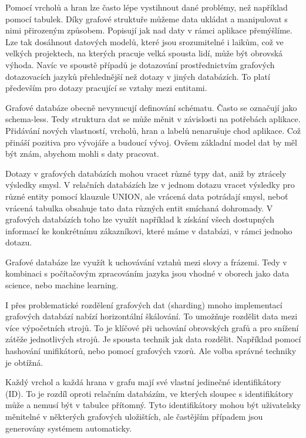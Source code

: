 \documentclass[
  program=infoi,
  biblatex=true,
  sourcecodes=true,
  figures=true,
  glossaries=false,
  index
]{kidiplom}
\begin{document}
Pomocí vrcholů a hran lze často lépe vystihnout dané problémy, než například pomocí tabulek. Díky grafové struktuře můžeme data ukládat a manipulovat s nimi přirozeným způsobem. Popisují jak nad daty v rámci aplikace přemýšlíme. Lze tak dosáhnout datových modelů, které jsou srozumitelné i laikům, což ve velkých projektech, na kterých pracuje velká spousta lidí, může být obrovská výhoda. Navíc ve spoustě případů je dotazování prostřednictvím grafových dotazovacích jazyků přehlednější než dotazy v jiných databázích. To platí především pro dotazy pracující se vztahy mezi entitami.

Grafové databáze obecně nevynucují definování schématu. Často se označují jako schema-less. Tedy struktura dat se může měnit v závislosti na potřebách aplikace. Přidávání nových vlastností, vrcholů, hran a labelů nenarušuje chod aplikace. Což přináší pozitiva pro vývojáře a budoucí vývoj. Ovšem základní model dat by měl být znám, abychom mohli s daty pracovat.

Dotazy v grafových databázích mohou vracet různé typy dat, aniž by ztrácely výsledky smysl. V relačních databázích lze v jednom dotazu vracet výsledky pro různé entity pomocí klauzule UNION, ale vrácená data potrádají smysl, neboť vrácená tabulka obsahuje tato data různých entit smíchaná dohromady. V grafových databázích toho lze využít například k získání všech dostupných informací ke konkrétnímu zákazníkovi, které máme v databázi, v rámci jednoho dotazu.

Grafové databáze lze využít k uchovávání vztahů mezi slovy a frázemi. Tedy v kombinaci s počítačovým zpracováním jazyka jsou vhodné v oborech jako data science, nebo machine learning.

I přes problematické rozdělení grafových dat (sharding) mnoho implementací grafových databází nabízí horizontální škálování. To umožňuje rozdělit data mezi více výpočetních strojů. To je klíčové při uchování obrovských grafů a pro snížení zátěže jednotlivých strojů. Je spousta technik jak data rozdělit. Například pomocí hashování unifikátorů, nebo pomocí grafových vzorů. Ale volba správné techniky je obtížná.

Každý vrchol a každá hrana v grafu mají své vlastní jedinečné identifikátory (ID). To je rozdíl oproti relačním databázím, ve kterých sloupec s identifikátory může a nemusí být v tabulce přítomný. Tyto identifikátory mohou být uživatelsky měnitelné v některých grafových uložištích, ale častějším případem jsou generovány systémem automaticky.
\end{document}
